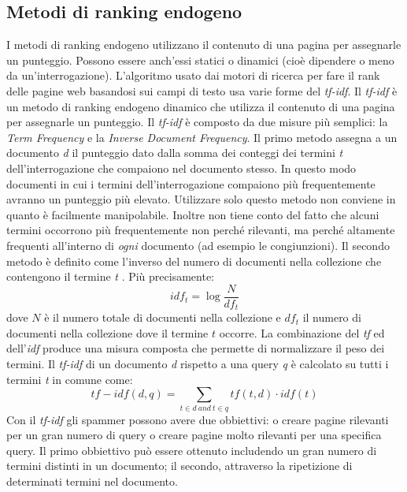 \subsection{Metodi di ranking endogeno}
I metodi di ranking endogeno utilizzano il contenuto di una pagina per assegnarle un punteggio. Possono essere anch’essi statici o dinamici (cioè dipendere o meno da un’interrogazione). L'algoritmo usato dai motori di ricerca per fare il rank delle pagine web basandosi sui campi di testo usa varie forme del \textit{tf-idf}. Il \textit{tf-idf} è un metodo di ranking endogeno dinamico che utilizza il contenuto di una pagina per assegnarle un punteggio. Il \textit{tf-idf} è  composto da due misure più semplici: la \textit{Term Frequency} e la \textit{Inverse Document Frequency}. Il primo metodo assegna a un documento \textit{d} il punteggio dato dalla somma dei conteggi dei termini \textit{t} dell'interrogazione che compaiono nel documento stesso. In questo modo documenti in cui i termini dell'interrogazione compaiono più frequentemente avranno un punteggio più elevato. Utilizzare solo questo metodo non conviene in quanto è facilmente manipolabile. Inoltre non tiene conto 
del fatto che alcuni termini occorrono più frequentemente non perché rilevanti, ma perché altamente frequenti all'interno di \textit{ogni} documento (ad esempio le congiunzioni). Il secondo metodo è definito come l'inverso del numero di documenti nella collezione che contengono il termine \textit{t} \cite{Manning:2008:IIR:1394399p117}. Più precisamente:
\begin{equation}
 idf_t=\log\frac{N}{df_t}
 \label{eq:idf}
\end{equation}
dove \(N\) è il numero totale di documenti nella collezione e \(df_t\) il numero di documenti nella collezione dove il termine \(t\) occorre.
La combinazione del \textit{tf} ed dell'\textit{idf} produce una misura composta che permette di normalizzare il peso dei termini. Il \textit{tf-idf} di un documento \textit{d} rispetto a una query \textit{q} è calcolato su tutti i termini \textit{t} in comune come:
\begin{equation}
 tf-idf(d,q)=\sum_{t \in d \: and \: t \in q} tf(t,d) \cdot idf(t)
\end{equation}
Con il \textit{tf-idf} gli spammer possono avere due obbiettivi: o creare pagine rilevanti per un gran numero di query o creare pagine molto rilevanti per una specifica query. Il primo obbiettivo può essere ottenuto includendo un gran numero di termini distinti in un documento; il secondo, attraverso la ripetizione di determinati termini nel documento.

